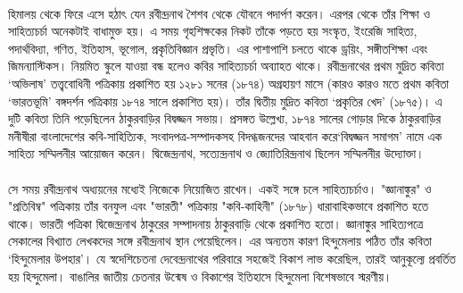 \documentclass{article}
\begin{document}
\paragraph{}
হিমালয় থেকে ফিরে এসে হঠাৎ যেন রবীন্দ্রনাথ শৈশব থেকে যৌবনে পদার্পণ করেন। এরপর থেকে তাঁর শিক্ষা ও সাহিত্যচর্চা অনেকটাই বাধামুক্ত হয়। এ সময় গৃহশিক্ষকের নিকট তাঁকে পড়তে হয় সংস্কৃত, ইংরেজি সাহিত্য, পদার্থবিদ্যা, গণিত, ইতিহাস, ভূগোল, প্রকৃতিবিজ্ঞান প্রভৃতি। এর পাশাপাশি চলতে থাকে ড্রয়িং, সঙ্গীতশিক্ষা এবং জিমন্যাস্টিকস। নিয়মিত স্কুলে যাওয়া বন্ধ হলেও কবির সাহিত্যচর্চা অব্যাহত থাকে। রবীন্দ্রনাথের প্রথম মুদ্রিত কবিতা ‘অভিলাষ’ তত্ত্ববোধিনী পত্রিকায় প্রকাশিত হয় ১২৮১ সনের (১৮৭৪) অগ্রহায়ণ মাসে (কারও কারও মতে প্রথম কবিতা ‘ভারতভূমি’ বঙ্গদর্শন পত্রিকায় ১৮৭৪ সালে প্রকাশিত হয়)। তাঁর দ্বিতীয় মুদ্রিত কবিতা ‘প্রকৃতির খেদ’ (১৮৭৫)। এ দুটি কবিতা তিনি পড়েছিলেন ঠাকুরবাড়ির বিদ্বজ্জন সভায়। প্রসঙ্গত উল্লেখ্য, ১৮৭৪ সালের গোড়ার দিকে ঠাকুরবাড়ির মনীষীরা বাংলাদেশের কবি-সাহিত্যিক, সংবাদপত্র-সম্পাদকসহ বিদগ্ধজনদের আহবান করে‘বিদ্বজ্জন সমাগম’ নামে এক সাহিত্য সম্মিলনীর আয়োজন করেন। দ্বিজেন্দ্রনাথ, সত্যেন্দ্রনাথ ও জ্যোতিরিন্দ্রনাথ ছিলেন সম্মিলনীর উদ্যোক্তা।
\paragraph{}
সে সময় রবীন্দ্রনাথ অধ্যয়নের মধ্যেই নিজেকে নিয়োজিত রাখেন। একই সঙ্গে চলে সাহিত্যচর্চাও। "জ্ঞানাঙ্কুর" ও "প্রতিবিম্ব" পত্রিকায় তাঁর বনফুল এবং "ভারতী" পত্রিকায় "কবি-কাহিনী" (১৮৭৮) ধারাবাহিকভাবে প্রকাশিত হতে থাকে। ভারতী পত্রিকা দ্বিজেন্দ্রনাথ ঠাকুরের সম্পাদনায় ঠাকুরবাড়ি থেকে প্রকাশিত হতো। জ্ঞানাঙ্কুর সাহিত্যপত্রে সেকালের বিখ্যাত লেখকদের সঙ্গে রবীন্দ্রনাথ স্থান পেয়েছিলেন। এর অন্যতম কারণ হিন্দুমেলায় পঠিত তাঁর কবিতা ‘হিন্দুমেলার উপহার’। যে স্বদেশিচেতনা দেবেন্দ্রনাথের পরিবারে সহজেই বিকাশ লাভ করেছিল, তারই আনুকূল্যে প্রবর্তিত হয়  হিন্দুমেলা। বাঙালির জাতীয় চেতনার উন্মেষ ও বিকাশের ইতিহাসে হিন্দুমেলা বিশেষভাবে স্মরণীয়।
\end{document}
